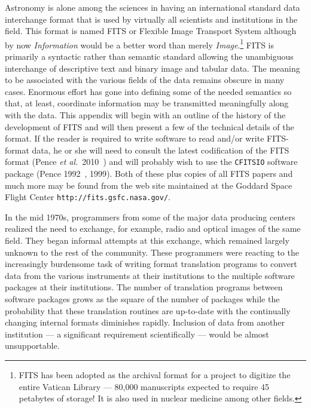 \documentclass[twoside]{article}
\newcommand{\etal}{{\it et al.}}
\newcommand{\keyw}[1]{\hbox{{\tt #1}}}
\begin{document}
Astronomy is alone among the sciences in having an international
standard data interchange format that is used by virtually all
scientists and institutions in the field.  This format is named FITS
or Flexible Image Transport System although by now {\it Information}
would be a better word than merely {\it Image}.\footnote{FITS has been
  adopted as the archival format for a project to digitize the entire
  Vatican Library --- 80,000 manuscripts expected to require 45
  petabytes of storage!  It is also used in nuclear medicine among
  other fields.}  FITS is primarily a syntactic rather than semantic
standard allowing the unambiguous interchange of descriptive text and
binary image and tabular data.  The meaning to be associated with the
various fields of the data remains obscure in many cases.  Enormous
effort has gone into defining some of the needed semantics so that, at
least, coordinate information may be transmitted meaningfully along
with the data.  This appendix will begin with an outline of the
history of the development of FITS and will then present a few of the
technical details of the format. If the reader is required to write
software to read and/or write FITS-format data, he or she will need to
consult the latest codification of the FITS format (Pence
\etal~2010~\cite{PCPSS10}) and will probably wish to use the
\keyw{CFITSIO} software package (Pence 1992~\cite{P92},
1999\cite{P99}).  Both of these plus copies of all FITS papers and
much more may be found from the web site maintained at the Goddard
Space Flight Center \keyw{http://fits.gsfc.nasa.gov/}.

In the mid 1970s, programmers from some of the major data producing
centers realized the need to exchange, for example, radio and optical
images of the same field.  They began informal attempts at this
exchange, which remained largely unknown to the rest of the community.
These programmers were reacting to the increasingly burdensome task of
writing format translation programs to convert data from the various
instruments at their institutions to the multiple software packages at
their institutions.  The number of translation programs between
software packages grows as the square of the number of packages while
the probability that these translation routines are up-to-date with
the continually changing internal formats diminishes rapidly.
Inclusion of data from another institution --- a significant
requirement scientifically --- would be almost unsupportable.
\end{document}
